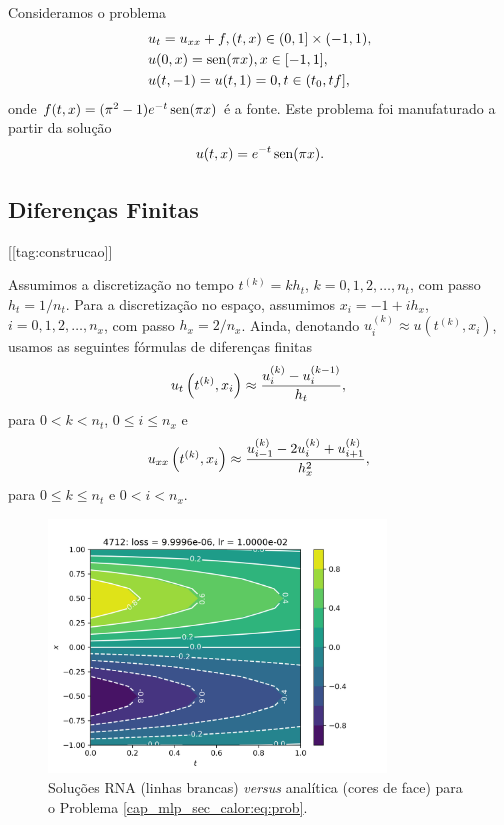 Consideramos o problema
\begin{subequations}\label{cap_mlp_sec_calor:eq:prob}
  \begin{align}
    &u_t = u_{xx} + f, (t,x)\in (0, 1] \times (-1, 1),\\
    &u(0,x) = \operatorname{sen}(\pi x), x\in [-1, 1],\\
    &u(t,-1) = u(t,1) = 0, t\in (t_0, tf],
  \end{align}
\end{subequations}
onde $f(t,x) = (\pi^2 - 1)e^{-t}\operatorname{sen}(\pi x)$ é a fonte. Este problema foi manufaturado a partir da solução
\begin{equation}
  u(t,x) = e^{-t}\operatorname{sen}(\pi x).
\end{equation}

\subsection{Diferenças Finitas}
[[tag:construcao]]

Assumimos a discretização no tempo $t^{(k)} = kh_t$, $k = 0, 1, 2, \dotsc, n_t$, com passo $h_t = 1/n_t$. Para a discretização no espaço, assumimos $x_{i} = -1 + ih_x$, $i = 0, 1, 2, \dotsc, n_x$, com passo $h_x = 2/n_x$. Ainda, denotando $u^{(k)}_i \approx u\left(t^{(k)}, x_i\right)$, usamos as seguintes fórmulas de diferenças finitas
\begin{equation}
  u_t\left(t^{(k)}, x_i\right) \approx \frac{u_i^{(k)} - u_i^{(k-1)}}{h_t},\\
\end{equation}
para $0<k<n_t$, $0\leq i\leq n_x$ e
\begin{equation}
  u_{xx}\left(t^{(k)}, x_i\right) \approx \frac{u_{i-1}^{(k)} - 2u_i^{(k)} + u_{i+1}^{(k)}}{h_x^2},\\
\end{equation}
para $0\leq k\leq n_t$ e $0 < i < n_x$.

\begin{figure}[H]
  \centering
  \includegraphics[width=0.8\textwidth]{./cap_mlp/dados/fig_mlp_calor/fig}
  \caption{Soluções RNA (linhas brancas) \textit{versus} analítica (cores de face) para o Problema \ref{cap_mlp_sec_calor:eq:prob}.}
  \label{cap_mlp_sec_calor:fig:rna_calor}
\end{figure}

